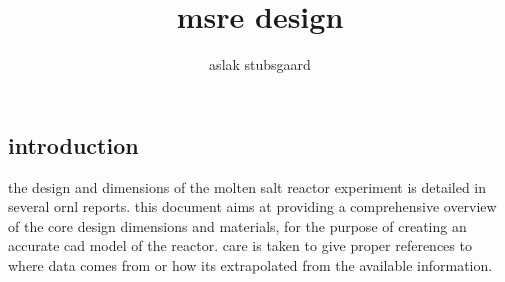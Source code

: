 \documentclass{article}
\title{msre design}
\author{aslak stubsgaard}
\date{}
\begin{document}
\begin{preview}
\maketitle

\section{introduction}
the design and dimensions of the molten salt reactor experiment is detailed in several ornl reports. this document aims at providing a comprehensive overview of the core design dimensions and materials, for the purpose of creating an accurate cad model of the reactor.
care is taken to give proper references to where data comes from or how its extrapolated from the available information.


\end{preview}
\end{document}
